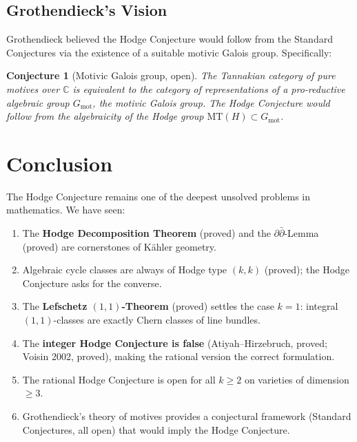 \documentclass[12pt,a4paper]{amsart}
\newtheorem{conjecture}[theorem]{Conjecture}
\theoremstyle{definition}
\theoremstyle{remark}
\begin{document}
\subsection{Grothendieck's Vision}

Grothendieck believed the Hodge Conjecture would follow from the Standard Conjectures
via the existence of a suitable motivic Galois group. Specifically:

\begin{conjecture}[Motivic Galois group, open]
\label{conj:motivic-galois}
The Tannakian category of pure motives over $\mathbb{C}$ is equivalent to the
category of representations of a pro-reductive algebraic group $G_{\mathrm{mot}}$,
the \emph{motivic Galois group}. The Hodge Conjecture would follow from the
algebraicity of the Hodge group $\mathrm{MT}(H) \subset G_{\mathrm{mot}}$.
\end{conjecture}

\section*{Conclusion}
\label{sec:conclusion}

The Hodge Conjecture remains one of the deepest unsolved problems in mathematics.
We have seen:

\begin{enumerate}[label=(\roman*)]
\item The \textbf{Hodge Decomposition Theorem} (proved) and the
  $\partial\bar\partial$-Lemma (proved) are cornerstones of Kähler geometry.
\item Algebraic cycle classes are always of Hodge type $(k,k)$ (proved); the
  Hodge Conjecture asks for the converse.
\item The \textbf{Lefschetz $(1,1)$-Theorem} (proved) settles the case $k=1$:
  integral $(1,1)$-classes are exactly Chern classes of line bundles.
\item The \textbf{integer Hodge Conjecture is false} (Atiyah–Hirzebruch, proved;
  Voisin 2002, proved), making the rational version the correct formulation.
\item The rational Hodge Conjecture is open for all $k \ge 2$ on varieties
  of dimension $\ge 3$.
\item Grothendieck's theory of motives provides a conjectural framework
  (Standard Conjectures, all open) that would imply the Hodge Conjecture.
\end{enumerate}
\end{document}
